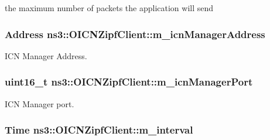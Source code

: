 the maximum number of packets the application will send 

\hypertarget{classns3_1_1OICNZipfClient_af1bb1bbc3778f4b0deff03288e1cd56f}{
\subsubsection[{m\-\_\-icn\-Manager\-Address}]{\setlength{\rightskip}{0pt plus 5cm}Address ns3\-::\-O\-I\-C\-N\-Zipf\-Client\-::m\-\_\-icn\-Manager\-Address\hspace{0.3cm}{\ttfamily [private]}}}\label{classns3_1_1OICNZipfClient_af1bb1bbc3778f4b0deff03288e1cd56f}


I\-C\-N Manager Address. 

\hypertarget{classns3_1_1OICNZipfClient_a9f0e99cf57dbab4950612c6eecfdeb8c}{
\subsubsection[{m\-\_\-icn\-Manager\-Port}]{\setlength{\rightskip}{0pt plus 5cm}uint16\-\_\-t ns3\-::\-O\-I\-C\-N\-Zipf\-Client\-::m\-\_\-icn\-Manager\-Port\hspace{0.3cm}{\ttfamily [private]}}}\label{classns3_1_1OICNZipfClient_a9f0e99cf57dbab4950612c6eecfdeb8c}


I\-C\-N Manager port. 

\hypertarget{classns3_1_1OICNZipfClient_a916a69a684a6422b37ee520c499430e9}{
\subsubsection[{m\-\_\-interval}]{\setlength{\rightskip}{0pt plus 5cm}Time ns3\-::\-O\-I\-C\-N\-Zipf\-Client\-::m\-\_\-interval\hspace{0.3cm}{\ttfamily [private]}}}\label{classns3_1_1OICNZipfClient_a916a69a684a6422b37ee520c499430e9}


